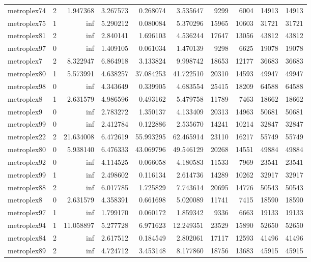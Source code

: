 \begin{longtable}{|l|r|r|r|r|r|r|r|r|r|}
metroplex74 & 2 & 1.947368 & 3.267573 & 0.268074 & 3.535647 & 9299 & 6004 & 14913 & 14913 \\
metroplex75 & 1 & inf & 5.290212 & 0.080084 & 5.370296 & 15965 & 10603 & 31721 & 31721 \\
metroplex81 & 2 & inf & 2.840141 & 1.696103 & 4.536244 & 17647 & 13056 & 43812 & 43812 \\
metroplex97 & 0 & inf & 1.409105 & 0.061034 & 1.470139 & 9298 & 6625 & 19078 & 19078 \\
metroplex7 & 2 & 8.322947 & 6.864918 & 3.133824 & 9.998742 & 18653 & 12177 & 36683 & 36683 \\
metroplex80 & 1 & 5.573991 & 4.638257 & 37.084253 & 41.722510 & 20310 & 14593 & 49947 & 49947 \\
metroplex98 & 0 & inf & 4.343649 & 0.339905 & 4.683554 & 25415 & 18209 & 64588 & 64588 \\
metroplex8 & 1 & 2.631579 & 4.986596 & 0.493162 & 5.479758 & 11789 & 7463 & 18662 & 18662 \\
metroplex9 & 0 & inf & 2.783272 & 1.350137 & 4.133409 & 20313 & 14963 & 50681 & 50681 \\
metroplex99 & 0 & inf & 2.412784 & 0.122886 & 2.535670 & 14241 & 10214 & 32847 & 32847 \\
metroplex22 & 2 & 21.634008 & 6.472619 & 55.993295 & 62.465914 & 23110 & 16217 & 55749 & 55749 \\
metroplex80 & 0 & 5.938140 & 6.476333 & 43.069796 & 49.546129 & 20268 & 14551 & 49884 & 49884 \\
metroplex92 & 0 & inf & 4.114525 & 0.066058 & 4.180583 & 11533 & 7969 & 23541 & 23541 \\
metroplex99 & 1 & inf & 2.498602 & 0.116134 & 2.614736 & 14289 & 10262 & 32917 & 32917 \\
metroplex88 & 2 & inf & 6.017785 & 1.725829 & 7.743614 & 20695 & 14776 & 50543 & 50543 \\
metroplex8 & 0 & 2.631579 & 4.358391 & 0.661698 & 5.020089 & 11741 & 7415 & 18590 & 18590 \\
metroplex97 & 1 & inf & 1.799170 & 0.060172 & 1.859342 & 9336 & 6663 & 19133 & 19133 \\
metroplex94 & 1 & 11.058897 & 5.277728 & 6.971623 & 12.249351 & 23529 & 15890 & 52650 & 52650 \\
metroplex84 & 2 & inf & 2.617512 & 0.184549 & 2.802061 & 17117 & 12593 & 41496 & 41496 \\
metroplex89 & 2 & inf & 4.724712 & 3.453148 & 8.177860 & 18756 & 13683 & 45915 & 45915 \\

\end{longtable}
